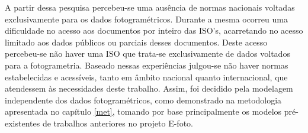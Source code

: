 A partir dessa pesquisa percebeu-se uma ausência de normas nacionais voltadas exclusivamente para os dados fotogramétricos. Durante a mesma ocorreu uma dificuldade no acesso aos documentos por inteiro das ISO's, acarretando no acesso limitado aos dados públicos ou parciais desses documentos. Deste acesso percebeu-se não haver uma ISO que trata-se exclusivamente de dados voltados para a fotogrametria. Baseado nessas experiências julgou-se não haver normas estabelecidas e acessíveis, tanto em âmbito nacional quanto internacional, que atendessem às necessidades deste trabalho. Assim, foi decidido pela modelagem independente dos dados fotogramétricos, como demonstrado na metodologia apresentada no capítulo \ref{met}, tomando por base principalmente os modelos pré-existentes de trabalhos anteriores no projeto E-foto. 

